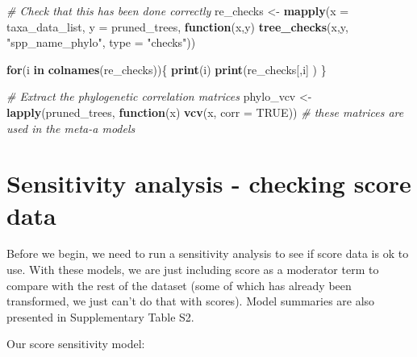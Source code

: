 \documentclass[]{article}
\newenvironment{Shaded}{\begin{snugshade}}{\end{snugshade}}
\newcommand{\KeywordTok}[1]{\textcolor[rgb]{0.13,0.29,0.53}{\textbf{#1}}}
\newcommand{\DataTypeTok}[1]{\textcolor[rgb]{0.13,0.29,0.53}{#1}}
\newcommand{\StringTok}[1]{\textcolor[rgb]{0.31,0.60,0.02}{#1}}
\newcommand{\CommentTok}[1]{\textcolor[rgb]{0.56,0.35,0.01}{\textit{#1}}}
\newcommand{\OtherTok}[1]{\textcolor[rgb]{0.56,0.35,0.01}{#1}}
\newcommand{\ControlFlowTok}[1]{\textcolor[rgb]{0.13,0.29,0.53}{\textbf{#1}}}
\newcommand{\NormalTok}[1]{#1}
\begin{document}
\begin{Shaded}
\begin{Highlighting}[]
      \CommentTok{# Check that this has been done correctly}
\NormalTok{        re_checks <-}\StringTok{ }\KeywordTok{mapply}\NormalTok{(}\DataTypeTok{x =}\NormalTok{ taxa_data_list, }
                             \DataTypeTok{y =}\NormalTok{ pruned_trees, }
                             \ControlFlowTok{function}\NormalTok{(x,y) }\KeywordTok{tree_checks}\NormalTok{(x,y, }\StringTok{"spp_name_phylo"}\NormalTok{, }\DataTypeTok{type =} \StringTok{"checks"}\NormalTok{))}
        
      \ControlFlowTok{for}\NormalTok{(i }\ControlFlowTok{in} \KeywordTok{colnames}\NormalTok{(re_checks))\{}
            \KeywordTok{print}\NormalTok{(i)}
            \KeywordTok{print}\NormalTok{(re_checks[,i] )}
\NormalTok{      \}}

\CommentTok{# Extract the phylogenetic correlation matrices}
\NormalTok{      phylo_vcv <-}\StringTok{ }\KeywordTok{lapply}\NormalTok{(pruned_trees, }\ControlFlowTok{function}\NormalTok{(x) }\KeywordTok{vcv}\NormalTok{(x, }\DataTypeTok{corr =} \OtherTok{TRUE}\NormalTok{)) }\CommentTok{# these matrices are used in the meta-a models}
\end{Highlighting}
\end{Shaded}

\section{Sensitivity analysis - checking score
data}\label{sensitivity-analysis---checking-score-data}

Before we begin, we need to run a sensitivity analysis to see if score
data is ok to use. With these models, we are just including score as a
moderator term to compare with the rest of the dataset (some of which
has already been transformed, we just can't do that with scores). Model
summaries are also presented in Supplementary Table S2.

Our score sensitivity model:
\end{document}
